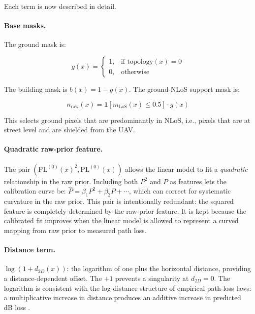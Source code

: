 Each term is now described in detail.

\paragraph{Base masks.}
The ground mask is:

\begin{equation}
g(x)=
\begin{cases}
1, & \text{if } \mathrm{topology}(x)=0 \\
0, & \text{otherwise}
\end{cases}
\label{eq:ground_mask_v2}
\end{equation}

The building mask is $b(x)=1-g(x)$.
The ground-NLoS support mask is:

\begin{equation}
n_{\mathrm{raw}}(x)=
\mathbf{1}\!\left[m_{\mathrm{LoS}}(x)\le 0.5\right]\cdot g(x)
\label{eq:nlos_mask_v2}
\end{equation}

This selects ground pixels that are predominantly in NLoS, i.e., pixels that
are at street level and are shielded from the UAV.

\paragraph{Quadratic raw-prior feature.}
The pair $(\mathrm{PL}^{(0)}(x)^2, \mathrm{PL}^{(0)}(x))$ allows the linear
model to fit a \emph{quadratic} relationship in the raw prior. Including both
$P^2$ and $P$ as features lets the calibration curve be:
$\hat P = \beta_1 P^2 + \beta_2 P + \cdots$, which can correct for
systematic curvature in the raw prior. This pair is intentionally redundant:
the squared feature is completely determined by the raw-prior feature. It is
kept because the calibrated fit improves when the linear model is allowed to
represent a curved mapping from raw prior to measured path loss.

\paragraph{Distance term.}
$\log(1+d_{2D}(x))$: the logarithm of one plus the horizontal distance,
providing a distance-dependent offset. The $+1$ prevents a singularity at
$d_{2D}=0$.
The logarithm is consistent with the log-distance structure of empirical
path-loss laws: a multiplicative increase in distance produces an additive
increase in predicted dB loss \cite{rappaport,cost231}.

